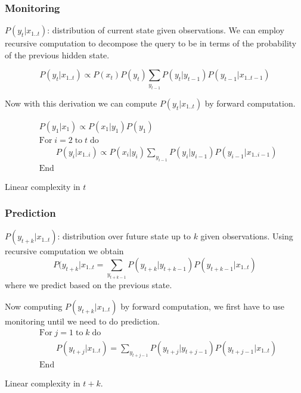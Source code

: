 \documentclass[12pt]{article}
\begin{document}
        \subsubsection{Monitoring}
            $P(y_{t}|x_{1..t})$: distribution of current state given observations. We can employ recursive computation to 
            decompose the query to be in terms of the probability of the previous hidden state.

            $$ P(y_{t}|x_{1..t}) \propto P(x_t)P(y_t) \sum_{y_{t-1}}P(y_{t}|y_{t-1})P(y_{t-1}|x_{1..t-1}) $$

            Now with this derivation we can compute $P(y_{t}|x_{1..t})$ by forward computation.

            \begin{align*}
                & P(y_1|x_1) \propto P(x_1|y_1)P(y_1) \\
                & \text{For} \; i=2 \; \text{to} \; t \; \text{do} \\
                & \qquad P(y_{i}|x_{1..i}) \propto P(x_i|y_i)\sum_{y_{i-1}} P(y_{i}|y_{i-1})P(y_{i-1}|x_{1..i-1}) \\
                & \text{End}
            \end{align*}

            Linear complexity in $t$
        
        \subsubsection{Prediction}
            $P(y_{t+k}|x_{1..t})$: distribution over future state up to $k$ given observations. Using recursive
            computation we obtain
            $$ P(y_{t+k}|x_{1..t} = \sum_{y_{t+k-1}} P(y_{t+k} | y_{t+k-1})P(y_{t+k-1}|x_{1..t}) $$
            where we predict based on the previous state.

            Now computing $P(y_{t+k} | x_{1..t})$ by forward computation, we first have to use monitoring until we
            need to do prediction.
            \begin{align*}
                & \text{For} \; j=1 \; \text{to} \; k \; \text{do} \\
                & \qquad P(y_{t+j}|x_{1..t}) = \sum_{y_{t+j-1}} P(y_{t+j}|y_{t+j-1})P(y_{t+j-1}|x_{1..t}) \\
                & \text{End}
            \end{align*}

            Linear complexity in $t+k$.
        
\end{document}
